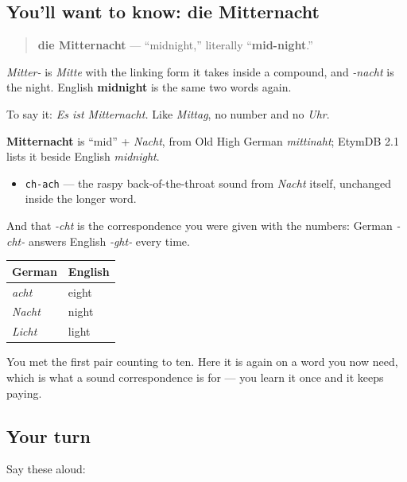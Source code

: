 \subsection*{You'll want to know: die Mitternacht}
\begin{quote}
\textbf{die Mitternacht} — \textquotedblleft{}midnight,\textquotedblright{} literally \textquotedblleft{}\textbf{mid-night}.\textquotedblright{}
\end{quote}

\emph{Mitter-} is \emph{Mitte} with the linking form it takes inside a compound, and \emph{-nacht} is the night. English \textbf{midnight} is the same two words again.

To say it: \emph{Es ist Mitternacht.} Like \emph{Mittag}, no number and no \emph{Uhr}.

\begin{cousinweb}
\textbf{Mitternacht} is \textquotedblleft{}mid\textquotedblright{} + \emph{Nacht}, from Old High German \emph{mittinaht}; EtymDB 2.1 lists it beside English \emph{midnight}.
\end{cousinweb}

\begin{sounds}
\begin{itemize}
\raggedright
  \item \texttt{ch-ach} — the raspy back-of-the-throat sound from \emph{Nacht} itself, unchanged inside the longer word.
\end{itemize}

And that \emph{-cht} is the correspondence you were given with the numbers: German \emph{-cht-} answers English \emph{-ght-} every time.

\noindent
\begin{tabularx}{\linewidth}{@{}>{\raggedright\arraybackslash}X>{\raggedright\arraybackslash}X@{}}
\toprule
\textbf{German} & \textbf{English} \\
\midrule
\emph{acht} & eight \\
\emph{Nacht} & night \\
\emph{Licht} & light \\
\bottomrule
\end{tabularx}

You met the first pair counting to ten. Here it is again on a word you now need, which is what a sound correspondence is for — you learn it once and it keeps paying.
\end{sounds}

\subsection*{Your turn}
Say these aloud:

